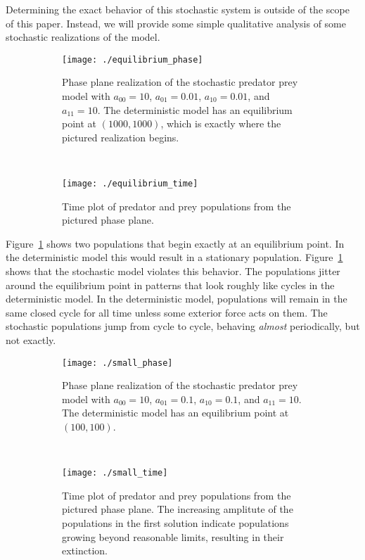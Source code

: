 \documentclass[12pt]{article}
\theoremstyle{definition}
\begin{document}
Determining the exact behavior of this stochastic system is outside of the
scope of this paper. Instead, we will provide some simple qualitative analysis
of some stochastic realizations of the model.

\begin{figure}[p]
    \centering
    \begin{subfigure}[t]{.5\textwidth}
        \texttt{[image: ./equilibrium\_phase]}
        \caption{Phase plane realization of the stochastic predator prey model
        with $a_{00} = 10$, $a_{01} = 0.01$, $a_{10} = 0.01$, and $a_{11} =
        10$. The deterministic model has an equilibrium point at $(1000,
        1000)$, which is exactly where the pictured realization begins.}
    \end{subfigure}%
    ~~~
    \begin{subfigure}[t]{.5\textwidth}
        \texttt{[image: ./equilibrium\_time]}
        \caption{Time plot of predator and prey populations from the pictured
        phase plane.}
    \end{subfigure}
    \caption{}
    \label{fig:broken-eq-pts}
\end{figure}

Figure~\ref{fig:broken-eq-pts} shows two populations that begin exactly at an
equilibrium point. In the deterministic model this would result in a stationary
population. Figure~\ref{fig:broken-eq-pts} shows that the stochastic model
violates this behavior. The populations jitter around the equilibrium point in
patterns that look roughly like cycles in the deterministic model. In the
deterministic model, populations will remain in the same closed cycle for all
time unless some exterior force acts on them. The stochastic populations jump
from cycle to cycle, behaving \emph{almost} periodically, but not exactly.

\begin{figure}[p]
    \centering
    \begin{subfigure}{.5\textwidth}
        \texttt{[image: ./small\_phase]}
        \caption{Phase plane realization of the stochastic predator prey model
        with $a_{00} = 10$, $a_{01} = 0.1$, $a_{10} = 0.1$, and $a_{11} =
        10$. The deterministic model has an equilibrium point at $(100, 100)$.}
    \end{subfigure}%
    ~~~
    \begin{subfigure}{.5\textwidth}
        \texttt{[image: ./small\_time]}
        \caption{Time plot of predator and prey populations from the pictured
        phase plane. The increasing amplitute of the populations in the first
        solution indicate populations growing beyond reasonable limits,
        resulting in their extinction.}
    \end{subfigure}
    \caption{}
    \label{fig:violent-cycles}
\end{figure}
\end{document}
